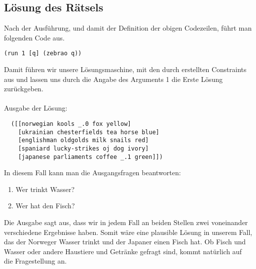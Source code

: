 \subsection{Lösung des Rätsels}

Nach der Ausführung, und damit der Definition der obigen Codezeilen, führt man folgenden Code aus.

\begin{lstlisting}
(run 1 [q] (zebrao q))
\end{lstlisting}
Damit führen wir unsere Lösungsmaschine, mit den durch  erstellten Constraints aus und lassen uns durch die Angabe des Arguments \dq{}1\dq{} die Erste Lösung zurückgeben.
\\
\\
Ausgabe der Lösung:

\begin{lstlisting}
  ([[norwegian kools _.0 fox yellow]
    [ukrainian chesterfields tea horse blue]
    [englishman oldgolds milk snails red]
    [spaniard lucky-strikes oj dog ivory]
    [japanese parliaments coffee _.1 green]])
\end{lstlisting}
In diesem Fall kann man die Ausgangsfragen beantworten:

\begin{enumerate}
  \item Wer trinkt Wasser?
  \item Wer hat den Fisch?
\end{enumerate}
Die Ausgabe sagt aus, dass wir in jedem Fall an beiden Stellen zwei voneinander verschiedene Ergebnisse haben. Somit wäre eine plausible Lösung in unserem Fall, das der Norweger Wasser trinkt und der Japaner einen Fisch hat. Ob Fisch und Wasser oder andere Haustiere und Getränke gefragt sind, kommt natürlich auf die Fragestellung an.

